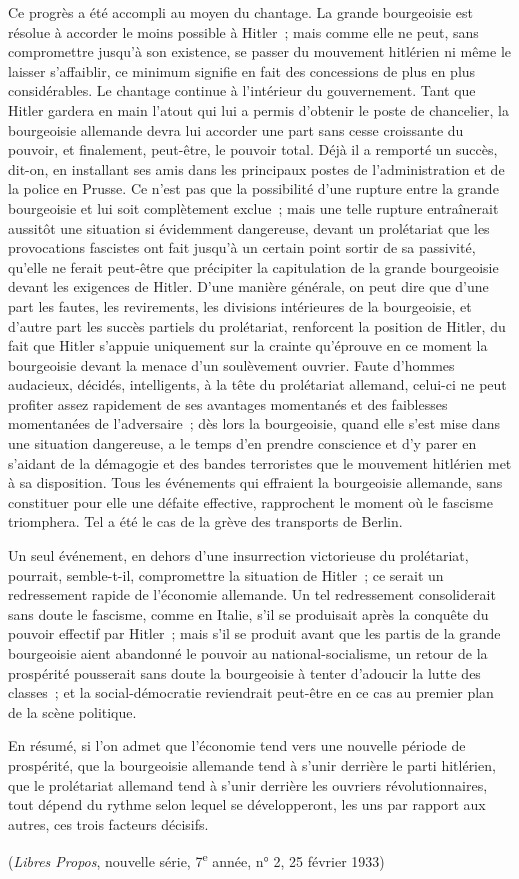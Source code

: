 \documentclass[french,twoside]{book} %
\begin{document}
Ce progrès a été accompli au moyen du chantage. La grande bourgeoisie est résolue à accorder le moins possible à Hitler ; mais comme elle ne peut, sans compromettre jusqu'à son existence, se passer du mouvement hitlérien ni même le laisser s'affaiblir, ce minimum signifie en fait des concessions de plus en plus considérables. Le chantage continue à l'intérieur du gouverne­ment. Tant que Hitler gardera en main l'atout qui lui a permis d'obtenir le poste de chancelier, la bourgeoisie allemande devra lui accorder une part sans cesse croissante du pouvoir, et finalement, peut-être, le pouvoir total. Déjà il a remporté un succès, dit-on, en installant ses amis dans les principaux postes de l'administration et de la police en Prusse. Ce n'est pas que la possibilité d'une rupture entre la grande bourgeoisie et lui soit complètement exclue ; mais une telle rupture entraînerait aussitôt une situation si évidemment dangereuse, devant un prolétariat que les provocations fascistes ont fait jusqu'à un certain point sortir de sa passivité, qu'elle ne ferait peut-être que précipiter la capitu­lation de la grande bourgeoisie devant les exigences de Hitler. D'une manière générale, on peut dire que d'une part les fautes, les revirements, les divisions intérieures de la bourgeoisie, et d'autre part les succès partiels du prolétariat, renforcent la position de Hitler, du fait que Hitler s'appuie uniquement sur la crainte qu'éprouve en ce moment la bourgeoisie devant la menace d'un soulèvement ouvrier. Faute d'hommes audacieux, décidés, intelligents, à la tête du prolétariat allemand, celui-ci ne peut profiter assez rapidement de ses avantages momentanés et des faiblesses momentanées de l'adversaire ; dès lors la bourgeoisie, quand elle s'est mise dans une situation dangereuse, a le temps d'en prendre conscience et d'y parer en s'aidant de la démagogie et des bandes terroristes que le mouvement hitlérien met à sa disposition. Tous les événements qui effraient la bourgeoisie allemande, sans constituer pour elle une défaite effective, rapprochent le moment où le fascisme triomphera. Tel a été le cas de la grève des transports de Berlin.\par
Un seul événement, en dehors d'une insurrection victorieuse du prolétariat, pourrait, semble-t-il, compromettre la situation de Hitler ; ce serait un redressement rapide de l'économie allemande. Un tel redressement consoli­derait sans doute le fascisme, comme en Italie, s'il se produisait après la conquête du pouvoir effectif par Hitler ; mais s'il se produit avant que les partis de la grande bourgeoisie aient abandonné le pouvoir au national-socialisme, un retour de la prospérité pousserait sans doute la bourgeoisie à tenter d'adoucir la lutte des classes ; et la social-démocratie reviendrait peut-être en ce cas au premier plan de la scène politique.\par
En résumé, si l'on admet que l'économie tend vers une nouvelle période de prospérité, que la bourgeoisie allemande tend à s'unir derrière le parti hitlé­rien, que le prolétariat allemand tend à s'unir derrière les ouvriers révolution­naires, tout dépend du rythme selon lequel se développeront, les uns par rapport aux autres, ces trois facteurs décisifs.\par
({\itshape Libres Propos}, nouvelle série, 7\textsuperscript{e} année, n° 2, 25 février 1933)
\end{document}
